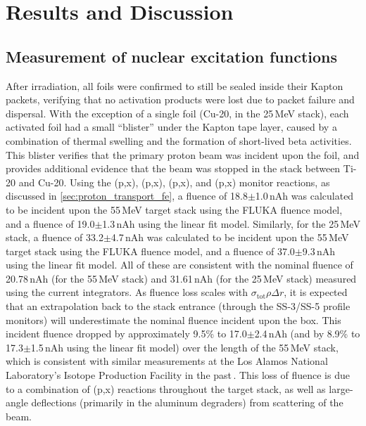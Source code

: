 \section{\label{sec:results_fe}Results and Discussion}


\subsection{Measurement of nuclear excitation functions}

After irradiation, all foils were confirmed to still be sealed inside their Kapton packets, verifying that no activation products were lost due to packet failure and dispersal.
With the exception of a single foil (Cu-20, in the 25\,MeV stack), each activated foil had a small \enquote{blister} under the Kapton tape layer, caused by a combination of thermal swelling and the formation of short-lived beta activities.
This blister   verifies that the primary proton beam was incident upon the foil, and provides additional 
evidence 
that the beam was stopped in the stack between Ti-20 and Cu-20.
Using the (p,x), (p,x), (p,x), and (p,x) monitor reactions, as discussed in \autoref{sec:proton_transport_fe}, a fluence of 18.8$\pm$1.0\,nAh was calculated to be incident upon the 55\,MeV target stack using the FLUKA fluence model, and a  fluence of 19.0$\pm$1.3\,nAh using the linear fit model.
Similarly, for the 25\,MeV stack, a fluence of 33.2$\pm$4.7\,nAh was calculated to be incident upon the 55\,MeV target stack using the FLUKA fluence model, and a  fluence of 37.0$\pm$9.3\,nAh using the linear fit model.
All of these are consistent with the nominal fluence of 20.78\,nAh (for the 55\,MeV stack) and 31.61\,nAh (for the 25\,MeV stack) measured using the 
current integrators.
As fluence loss scales with $\sigma_{\mathrm{tot}}\rho\Delta r$, it is expected that an extrapolation back to the stack entrance (through the SS-3/SS-5 profile monitors) will underestimate the nominal fluence incident upon the box.
This incident fluence dropped by approximately 9.5\% to  17.0$\pm$2.4\,nAh (and by 8.9\% to  17.3$\pm$1.5\,nAh using the linear fit model) over the length of the 55\,MeV stack, which is consistent with similar measurements at the Los Alamos National Laboratory's Isotope Production Facility in the past\,\cite{Voyles2018a,Graves2016}.
This loss of fluence is due to a combination of 
(p,x) reactions throughout the target stack, as well as large-angle deflections (primarily in the aluminum degraders) from scattering of the beam.





